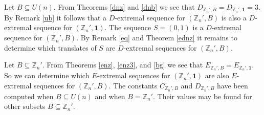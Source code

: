 \documentclass{article}[11pt]
\theoremstyle{definition}
\begin{document}
Let $B\subseteq U(n)$. From Theorems \ref{dnz} and \ref{dnb} we see that $D_{\mathbb Z_n',B}=D_{\mathbb Z_n',\mathbf 1}=3$. By Remark \ref{ub} it follows that a $D$-extremal sequence for $(\mathbb Z_n',B)$ is also a $D$-extremal sequence for $(\mathbb Z_n',\mathbf 1)$. The sequence $S=(0,1)$ is a $D$-extremal sequence for $(\mathbb Z_n',B)$. By Remark \ref{eq} and Theorem \ref{ednz} it remains to determine which translates of $S$ are $D$-extremal sequences for $(\mathbb Z_n',B)$.

Let $B\subseteq \mathbb Z_n'$. From Theorems \ref{enz}, \ref{enz3}, and \ref{bg} we see that $E_{\mathbb Z_n',B}=E_{\mathbb Z_n',\mathbf 1}$. So we can determine which $E$-extremal sequences for $(\mathbb Z_n',\mathbf 1)$ are also $E$-extremal sequences for $(\mathbb Z_n',B)$. The constants $C_{\mathbb Z_n',B}$ and $D_{\mathbb Z_n',B}$ have been computed when $B\subseteq U(n)$ and when $B=\mathbb Z_n'$. Their values may be found for other subsets $B\subseteq \mathbb Z_n'$.
\bigskip
\end{document}
